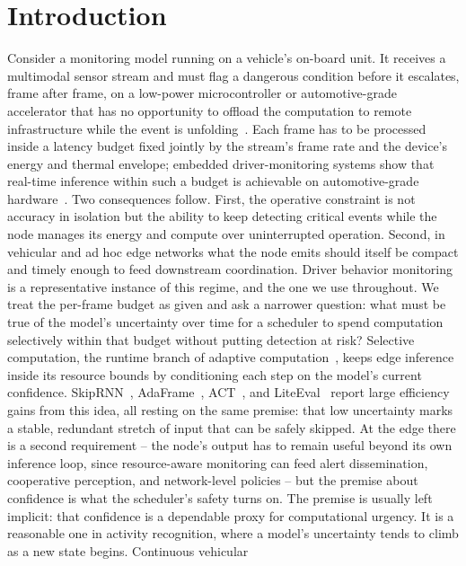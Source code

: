 \documentclass[a4paper,fleqn]{cas-dc}
\begin{document}
\section{Introduction}
\label{sec:introducao}
Consider a monitoring model running on a vehicle's on-board unit. It receives a
multimodal sensor stream and must flag a dangerous condition before it escalates,
frame after frame, on a low-power microcontroller or automotive-grade accelerator
that has no opportunity to offload the computation to remote infrastructure while
the event is unfolding~\cite{bouhsissin2023driver,ortega2020dmd}. Each frame has to
be processed inside a latency budget fixed jointly by the stream's frame rate and
the device's energy and thermal envelope; embedded driver-monitoring systems show
that real-time inference within such a budget is achievable on automotive-grade
hardware~\cite{hariharan2023driveredge,tinydl2025driverstate}. Two consequences
follow. First, the operative constraint is not accuracy in isolation but the
ability to keep detecting critical events while the node manages its energy and
compute over uninterrupted operation. Second, in vehicular and ad hoc edge
networks what the node emits should itself be compact and timely enough to feed
downstream coordination. Driver behavior monitoring is a representative instance of
this regime, and the one we use throughout. We treat the per-frame budget as given
and ask a narrower question: what must be true of the model's uncertainty over time
for a scheduler to spend computation selectively within that budget without putting
detection at risk?
Selective computation, the runtime branch of adaptive
computation~\cite{han2022dynamic}, keeps edge inference inside its resource bounds
by conditioning each step on the model's current confidence. SkipRNN~\cite{campos2018skip},
AdaFrame~\cite{wu2019adaframe}, ACT~\cite{graves2016adaptive}, and
LiteEval~\cite{wu2019liteeval} report large efficiency gains from this idea, all
resting on the same premise: that low uncertainty marks a stable, redundant stretch
of input that can be safely skipped. At the edge there is a second requirement --
the node's output has to remain useful beyond its own inference loop, since
resource-aware monitoring can feed alert dissemination, cooperative perception, and
network-level policies -- but the premise about confidence is what the scheduler's
safety turns on.
The premise is usually left implicit: that confidence is a dependable proxy for
computational urgency. It is a reasonable one in activity recognition, where a
model's uncertainty tends to climb as a new state begins. Continuous vehicular
\end{document}

